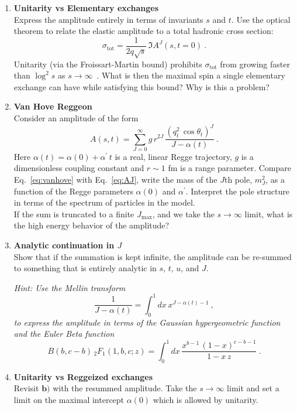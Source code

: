 \begin{enumerate}
\item \textbf{Unitarity vs Elementary exchanges} \\
Express the amplitude entirely in terms of invariants $s$ and $t$. Use the optical theorem to relate the elastic amplitude to a total hadronic cross section:
\begin{equation}
    \sigma_\text{tot} = \frac{1}{2q\sqrt{s}} \, \Im A^J(s,t=0)~.
\end{equation}
Unitarity (via the Froissart-Martin bound) prohibits $\sigma_\text{tot}$ from growing faster than $\log^2 s$ as $s\to\infty$~. What is then the maximal spin a single elementary exchange can have while satisfying this bound? Why is this a problem?

\item \textbf{Van Hove Reggeon} \\
Consider an amplitude of the form 
    \begin{equation}
        \label{eq:vanhove}
        A(s,t) = \sum_{J=0}^\infty g \, r^{2J} \, \frac{ (q_t^2 \, \cos\theta_t)^J}{J- \alpha(t)} ~.
    \end{equation}
Here $\alpha(t) = \alpha(0) + \alpha^\prime \, t$ is a real, linear Regge trajectory, $g$ is a dimensionless coupling constant and $r \sim 1$ fm is a range parameter. 
Compare Eq.~\ref{eq:vanhove} with Eq.~\ref{eq:AJ}, write the mass of the $J$th pole, $m_J^2$, as a function of the Regge parameters $\alpha(0)$ and $\alpha^\prime$. Interpret the pole structure in terms of the spectrum of particles in the model. 
\\

\noindent If the sum is truncated to a finite $J_\text{max}$, and we take the $s\to \infty$ limit, what is the high energy behavior of the amplitude? 

\item \textbf{Analytic continuation in $J$} \\
Show that if the summation is kept infinite, the amplitude can be re-summed to something that is entirely analytic in $s$, $t$, $u$, and $J$. 

\noindent \textit{Hint: Use the Mellin transform
    \begin{equation}
        \frac{1}{J-\alpha(t)} = \int_0^1 dx \, x^{J-\alpha(t) - 1} ~,
    \end{equation}
to express the amplitude in terms of the Gaussian hypergeometric function and the Euler Beta function
    \begin{equation}
        B(b, c-b) \, _2F_1(1, b, c; z) =  \int_0^1 dx \, \frac{ x^{b-1} \, (1-x)^{c-b-1}}{1-x \, z} ~. 
    \end{equation}
}
\item \textbf{Unitarity vs Reggeized exchanges} \\
Revisit $\mathbf{b)}$ with the resummed amplitude. Take the $s\to\infty$ limit and set a limit on the maximal intercept $\alpha(0)$ which is allowed by unitarity.  


\end{enumerate}
